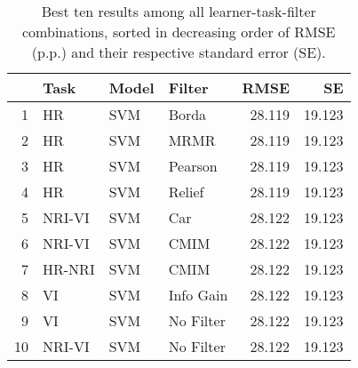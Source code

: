 \begin{table}[ht!]
\centering
\caption{Best ten results among all learner-task-filter combinations, sorted in decreasing order of RMSE (p.p.) and their respective standard error (SE).} 
\label{tab:perf-top-10}
\begin{tabular}{rlllrr}
  \hline
 & Task & Model & Filter & RMSE & SE \\ 
  \hline
1 & HR & SVM & Borda & 28.119 & 19.123 \\ 
  2 & HR & SVM & MRMR & 28.119 & 19.123 \\ 
  3 & HR & SVM & Pearson & 28.119 & 19.123 \\ 
  4 & HR & SVM & Relief & 28.119 & 19.123 \\ 
  5 & NRI-VI & SVM & Car & 28.122 & 19.123 \\ 
  6 & NRI-VI & SVM & CMIM & 28.122 & 19.123 \\ 
  7 & HR-NRI & SVM & CMIM & 28.122 & 19.123 \\ 
  8 & VI & SVM & Info Gain & 28.122 & 19.123 \\ 
  9 & VI & SVM & No Filter & 28.122 & 19.123 \\ 
  10 & NRI-VI & SVM & No Filter & 28.122 & 19.123 \\ 
   \hline
\end{tabular}
\end{table}
